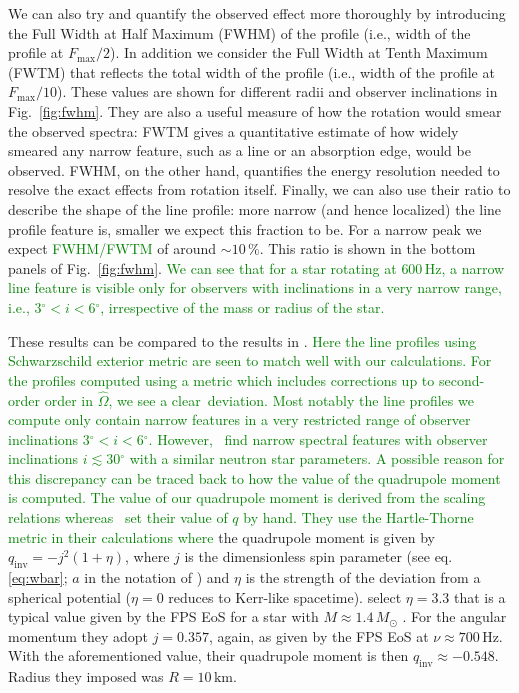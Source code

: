 \documentclass{aa}
\newcommand{\refe}[1]{\textcolor{green}{{#1}}}
\newcommand{\sch}{Schwarzschild }
\newcommand{\Ob}{\ensuremath{\hat{\Omega}}}
\newcommand{\Msun}{\ensuremath{M_{\odot}}}
\newcommand{\qinv}{\ensuremath{q_{\mathrm{inv}}}}
\renewcommand{\deg}{\ensuremath{^{\circ}}}
\begin{document}
We can also try and quantify the observed effect more thoroughly by introducing the Full Width at Half Maximum (FWHM) of the profile (i.e., width of the profile at $F_{\mathrm{max}}/2$).
In addition we consider the Full Width at Tenth Maximum (FWTM) that reflects the total width of the profile (i.e., width of the profile at $F_{\mathrm{max}}/10$).
These values are shown for different radii and observer inclinations in Fig.~\ref{fig:fwhm}.
They are also a useful measure of how the rotation would smear the observed spectra:
FWTM gives a quantitative estimate of how widely smeared any narrow feature, such as a line or an absorption edge, would be observed.
FWHM, on the other hand, quantifies the energy resolution needed to resolve the exact effects from rotation itself.
Finally, we can also use their ratio to describe the shape of the line profile:
more narrow (and hence localized) the line profile feature is, smaller we expect this fraction to be.
For a narrow peak we expect \refe{FWHM/FWTM} of around $\sim 10\,\%$.
This ratio is shown in the bottom panels of Fig.~\ref{fig:fwhm}.
\refe{We can see that for a star rotating at $600\,\mathrm{Hz}$, a narrow line feature is visible only for observers with inclinations in a very narrow range, i.e., $3\deg  < i < 6\deg$, irrespective of the mass or radius of the star.}


These results can be compared to the results in \citet{BPO13}. 
\refe{Here the line profiles using \sch exterior metric are seen to match well with our calculations.}
\refe{For the profiles computed using a metric which includes corrections up to second-order order in $\Ob$, we see a clear deviation.}
\refe{Most notably the line profiles we compute only contain narrow features in a very restricted range of observer inclinations $3\deg  < i < 6\deg$. }
\refe{However, \citet{BPO13} find narrow spectral features with observer inclinations $i \lesssim 30\deg$ with a similar neutron star parameters.}
\refe{A possible reason for this discrepancy can be traced back to how the value of the quadrupole moment is computed.}
\refe{The value of our quadrupole moment is derived from the scaling relations whereas \citet{BPO13} set their value of $q$ by hand.}
\refe{They use the Hartle-Thorne metric \citep{HT68} in their calculations where} the quadrupole moment is given by $\qinv = -j^2 (1 + \eta)$, where $j$ is the dimensionless spin parameter (see eq. \eqref{eq:wbar}; $a$ in the notation of \citealt{BPO13}) and $\eta$ is the strength of the deviation from a spherical potential ($\eta = 0$ reduces to Kerr-like spacetime).
\citet{BPO13} select $\eta=3.3$ that is a typical value given by the FPS EoS \citep{FPS} for a star with $M\approx1.4\,\Msun$ \citep[see][]{LP99}.
For the angular momentum they adopt $j = 0.357$, again, as given by the FPS EoS at $\nu \approx 700\,\mathrm{Hz}$.
With the aforementioned value, their quadrupole moment is then $\qinv \approx -0.548$.
Radius they imposed was $R = 10\,\mathrm{km}$.
\end{document}
